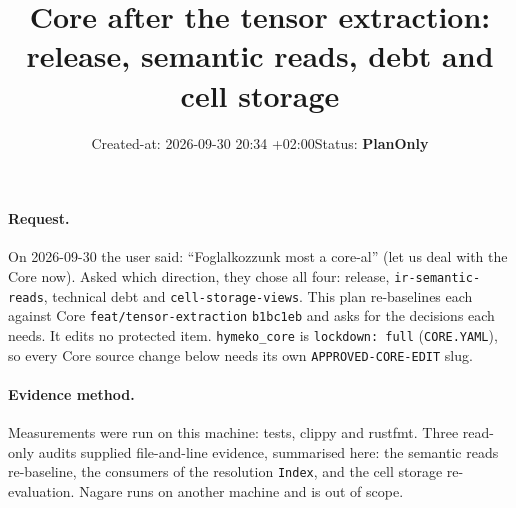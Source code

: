\documentclass[11pt,a4paper]{article}
\title{Core after the tensor extraction:\\release, semantic reads, debt and cell storage}
\date{Created-at: 2026-09-30 20:34 +02:00\quad Status: \textbf{PlanOnly}}
\newcommand{\code}[1]{\texttt{#1}}
\begin{document}
\maketitle

\paragraph{Request.} On 2026-09-30 the user said: ``Foglalkozzunk most a core-al'' (let us deal with the Core now). Asked which
direction, they chose all four: release, \code{ir-semantic-reads}, technical debt and \code{cell-storage-views}.
This plan re-baselines each against Core \code{feat/tensor-extraction} \code{b1bc1eb} and asks for the decisions each
needs. It edits no protected item. \code{hymeko\_core} is \code{lockdown: full} (\code{CORE.YAML}), so every Core
source change below needs its own \code{APPROVED-CORE-EDIT} slug.

\paragraph{Evidence method.} Measurements were run on this machine: tests, clippy and rustfmt. Three read-only
audits supplied file-and-line evidence, summarised here: the semantic reads re-baseline, the consumers of the
resolution \code{Index}, and the cell storage re-evaluation. Nagare runs on another machine and is out of scope.
\end{document}
